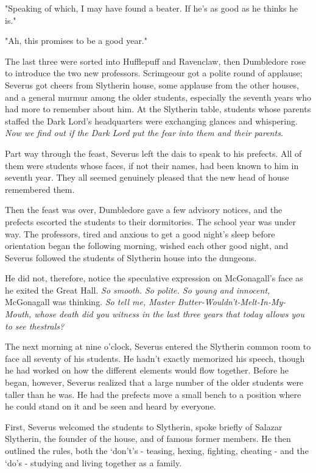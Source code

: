 \documentclass[a4paper,11pt]{article}
\begin{document}
"Speaking of which, I may have found a beater. If he's as good as he thinks he is."

"Ah, this promises to be a good year."

The last three were sorted into Hufflepuff and Ravenclaw, then Dumbledore rose to introduce the two new professors. Scrimgeour got a polite round of applause; Severus got cheers from Slytherin house, some applause from the other houses, and a general murmur among the older students, especially the seventh years who had more to remember about him. At the Slytherin table, students whose parents staffed the Dark Lord's headquarters were exchanging glances and whispering. \emph{Now we find out if the Dark Lord put the fear into them and their parents.}

Part way through the feast, Severus left the dais to speak to his prefects. All of them were students whose faces, if not their names, had been known to him in seventh year. They all seemed genuinely pleased that the new head of house remembered them.

Then the feast was over, Dumbledore gave a few advisory notices, and the prefects escorted the students to their dormitories. The school year was under way. The professors, tired and anxious to get a good night's sleep before orientation began the following morning, wished each other good night, and Severus followed the students of Slytherin house into the dungeons.

He did not, therefore, notice the speculative expression on McGonagall's face as he exited the Great Hall. \emph{So smooth. So polite. So young and innocent,} McGonagall was thinking. \emph{So tell me, Master Butter-Wouldn't-Melt-In-My-Mouth, whose death did you witness in the last three years that today allows you to see thestrals?}

The next morning at nine o'clock, Severus entered the Slytherin common room to face all seventy of his students. He hadn't exactly memorized his speech, though he had worked on how the different elements would flow together. Before he began, however, Severus realized that a large number of the older students were taller than he was. He had the prefects move a small bench to a position where he could stand on it and be seen and heard by everyone.

First, Severus welcomed the students to Slytherin, spoke briefly of Salazar Slytherin, the founder of the house, and of famous former members. He then outlined the rules, both the `don't's - teasing, hexing, fighting, cheating - and the `do's - studying and living together as a family.
\end{document}
